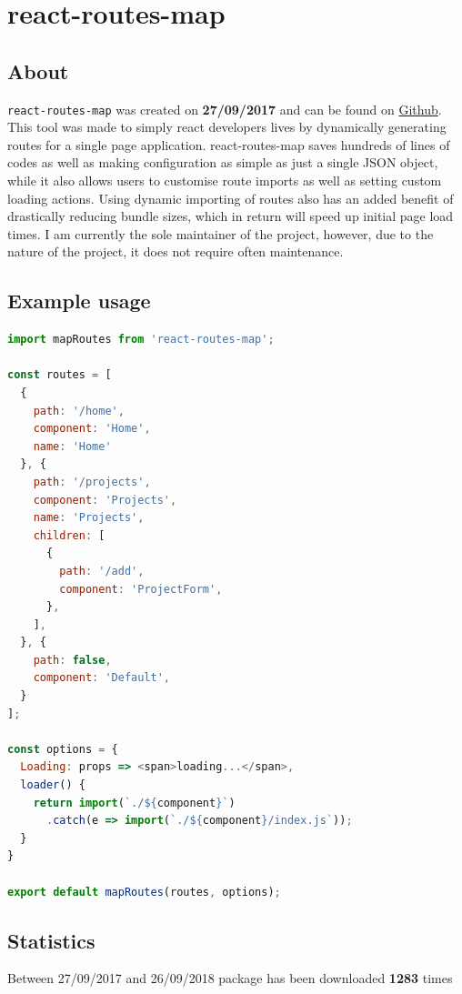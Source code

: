 \documentclass{article}
\begin{document}
\newpage

\section{react-routes-map}

\subsection{About}
\begin{flushleft}
\texttt{react-routes-map} was created on \textbf{27/09/2017} and can be found on \href{https://github.com/WhoAteDaCake/react-router-map}{Github}.\\
This tool was made to simply react developers lives by dynamically generating routes for a single page application. react-routes-map saves hundreds of lines of codes as well as making configuration as simple as just a single JSON object, while it also allows users to customise route imports as well as setting custom loading actions. Using dynamic importing of routes also has an added benefit of drastically reducing bundle sizes, which in return will speed up initial page load times. I am currently the sole maintainer of the project, however, due to the nature of the project, it does not require often maintenance.
\end{flushleft}

\subsection{Example usage}

\begin{lstlisting}[language=Javascript]
import mapRoutes from 'react-routes-map';
 
const routes = [
  {
    path: '/home',
    component: 'Home',
    name: 'Home'
  }, {
    path: '/projects',
    component: 'Projects',
    name: 'Projects',
    children: [
      {
        path: '/add',
        component: 'ProjectForm',
      },
    ],
  }, {
    path: false,
    component: 'Default',
  }
];
 
const options = {
  Loading: props => <span>loading...</span>,
  loader() {
    return import(`./${component}`)
      .catch(e => import(`./${component}/index.js`));
  }
}
 
export default mapRoutes(routes, options);
\end{lstlisting}

\pagebreak

\subsection{Statistics}
\begin{flushleft}
Between 27/09/2017 and 26/09/2018 package has been downloaded \textbf{1283} times
\end{flushleft}
\end{document}

